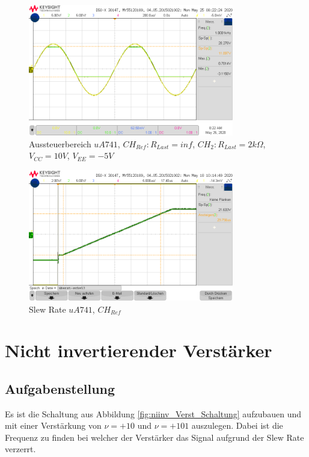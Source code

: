 \begin{figure}[H]
    \centering
    \includegraphics[width=0.8\textwidth]{Lab_1/Messungen/Folger/scope_5.png}
    \caption{Aussteuerbereich $uA741$, $CH_{Ref}: R_{Last} = inf$, $CH_{2}: R_{Last} = 2k\Omega$, $V_{CC} = 10V$, $V_{EE} = -5V$}
    \label{fig:my_label}
\end{figure}

\begin{figure}[H]
    \centering
    \includegraphics[width=0.8\textwidth]{Lab_1/Messungen/Folger/uberst-schw13.png}
    \caption{Slew Rate $uA741$, $CH_{Ref}$}
    \label{fig:my_label}
\end{figure}

\section{Nicht invertierender Verstärker}
\subsection{Aufgabenstellung}
Es ist die Schaltung aus Abbildung \ref{fig:niinv_Verst_Schaltung} aufzubauen und mit  einer Verstärkung von $\nu=+10$ und $\nu = +101$ auszulegen. Dabei ist die Frequenz zu finden bei welcher der Verstärker das Signal aufgrund der Slew Rate verzerrt. 

